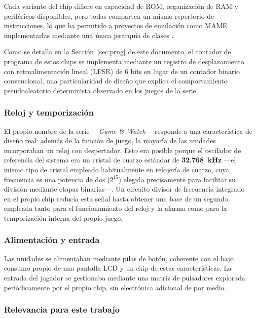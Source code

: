 \documentclass[../main.tex]{subfiles}
\begin{document}
	Cada variante del chip difiere en capacidad de ROM, organización de RAM y periféricos disponibles, pero todas comparten un mismo repertorio de instrucciones, lo que ha permitido a proyectos de emulación como MAME implementarlas mediante una única jerarquía de clases \cite{retroreversing_gw}.

	Como se detalla en la Sección~\ref{sec:prng} de este documento, el contador de programa de estos chips se implementa mediante un registro de desplazamiento con retroalimentación lineal (LFSR) de 6 bits en lugar de un contador binario convencional, una particularidad de diseño que explica el comportamiento pseudoaleatorio determinista observado en los juegos de la serie.

	\subsubsection{Reloj y temporización}

	El propio nombre de la serie —\emph{Game \& Watch}— responde a una característica de diseño real: además de la función de juego, la mayoría de las unidades incorporaban un reloj con despertador. Esto era posible porque el oscilador de referencia del sistema era un cristal de cuarzo estándar de \textbf{32.768~kHz} —el mismo tipo de cristal empleado habitualmente en relojería de cuarzo, cuya frecuencia es una potencia de dos ($2^{15}$) elegida precisamente para facilitar su división mediante etapas binarias—. Un circuito divisor de frecuencia integrado en el propio chip reducía esta señal hasta obtener una base de un segundo, empleada tanto para el funcionamiento del reloj y la alarma como para la temporización interna del propio juego.

	\subsubsection{Alimentación y entrada}

	Las unidades se alimentaban mediante pilas de botón, coherente con el bajo consumo propio de una pantalla LCD y un chip de estas características. La entrada del jugador se gestionaba mediante una matriz de pulsadores explorada periódicamente por el propio chip, sin electrónica adicional de por medio.

	\subsubsection{Relevancia para este trabajo}
\end{document}
